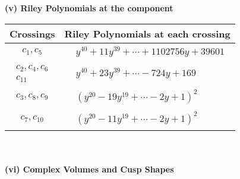 \documentclass[1p]{elsarticle_modified}
\theoremstyle{definition}
\begin{document}
\newpage\renewcommand{\arraystretch}{1}
\flushleft \textbf{(v) Riley Polynomials at the component}\newline \\
\begin{tabular}{m{50pt}|m{274pt}}
Crossings & \hspace{64pt}Riley Polynomials at each crossing \\
\hline $$\begin{aligned}c_{1},c_{5}\end{aligned}$$&$\begin{aligned}
&y^{40}+11 y^{39}+\cdots+1102756 y+39601
\end{aligned}$\\
\hline $$\begin{aligned}c_{2},c_{4},c_{6}\\c_{11}\end{aligned}$$&$\begin{aligned}
&y^{40}+23 y^{39}+\cdots-724 y+169
\end{aligned}$\\
\hline $$\begin{aligned}c_{3},c_{8},c_{9}\end{aligned}$$&$\begin{aligned}
&(y^{20}-19 y^{19}+\cdots-2 y+1)^{2}
\end{aligned}$\\
\hline $$\begin{aligned}c_{7},c_{10}\end{aligned}$$&$\begin{aligned}
&(y^{20}-11 y^{19}+\cdots-2 y+1)^{2}
\end{aligned}$\\
\hline
\end{tabular}\\~\\
\newpage\flushleft \textbf{(vi) Complex Volumes and Cusp Shapes}
\end{document}
